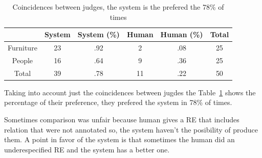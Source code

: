 \begin{table}[h!]
\begin{center}
\begin{tabular}{|c|c|c|c|c|c|}
\hline
           & System & System (\%) & Human & Human (\%) & Total\\
\hline
Furniture & 23  & .92 &  2 & .08  & 25 \\
People    & 16  & .64 & 9  & .36 & 25 \\
\hline
Total     & 39  & .78    & 11 & .22 & 50  \\
\hline
\end{tabular}
\caption{Coincidences between judges, the system is the prefered the 78\% of times} 
\label{system-better}
\end{center}
\end{table}
Taking into account just the coincidences between jugdes the Table~\ref{system-better} shows the percentage of their preference, they prefered the system in 78\% of times.

Sometimes comparison was unfair because human gives a RE that includes relation that were not annotated so, the system haven't the posibility of produce them. A point in favor of the system is that sometimes the human did an underespecified RE and the system has a better one.\\

